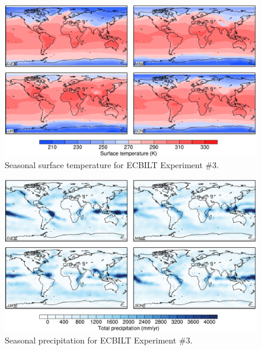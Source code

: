 \documentclass[a4paper,11pt]{article}
\begin{document}
\begin{figure}
  \begin{center}
    \includegraphics[width=\textwidth]{../expt-3/plots/ts-plots}
  \end{center}
  \caption{Seasonal surface temperature for ECBILT Experiment \#3.}
  \label{fig:ts-3}
\end{figure}

\begin{figure}
  \begin{center}
    \includegraphics[width=\textwidth]{../expt-3/plots/pp-plots}
  \end{center}
  \caption{Seasonal precipitation for ECBILT Experiment \#3.}
  \label{fig:pp-3}
\end{figure}
\end{document}
